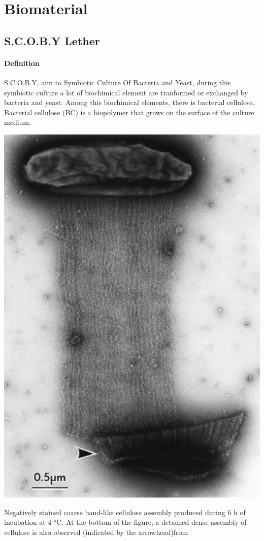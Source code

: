 \section{Biomaterial}
\subsection{S.C.O.B.Y Lether} 

\paragraph[short]{Definition } 
S.C.O.B.Y, aim to Symbiotic Culture Of Bacteria and Yeast, during this symbiotic culture a lot of biochimical element are tranformed or exchanged by bacteria and yeast.
Among this biochimical elements, there is bacterial cellulose. Bacterial cellulose (BC) is a biopolymer that grows on the surface of the culture medium. 

\begin{marginfigure}[h]
    \centering
    \includegraphics{images/bacteriaandcellulose.png}
    \caption{Negatively stained coarse band-like cellulose assembly produced during 6 h of incubation at 4 °C. At the bottom of the figure, a
    detached dense assembly of cellulose is also observed (indicated by the arrowhead)from\cite{hirai2002tem}}
    \label{fig:bacteriaandcellulose}
\end{marginfigure}

